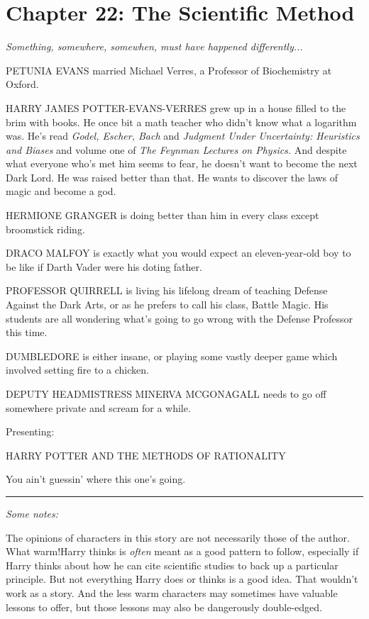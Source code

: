 \chapter{Chapter 22: The Scientific Method}
\emph{Something, somewhere, somewhen, must have happened
differently...}

PETUNIA EVANS married Michael Verres, a Professor of Biochemistry at
Oxford.

HARRY JAMES POTTER-EVANS-VERRES grew up in a house filled to the brim
with books. He once bit a math teacher who didn't know what a logarithm
was. He's read \emph{Godel, Escher, Bach} and \emph{Judgment Under
Uncertainty: Heuristics and Biases} and volume one of \emph{The Feynman
Lectures on Physics.} And despite what everyone who's met him seems to
fear, he doesn't want to become the next Dark Lord. He was raised better
than that. He wants to discover the laws of magic and become a god.

HERMIONE GRANGER is doing better than him in every class except
broomstick riding.

DRACO MALFOY is exactly what you would expect an eleven-year-old boy to
be like if Darth Vader were his doting father.

PROFESSOR QUIRRELL is living his lifelong dream of teaching Defense
Against the Dark Arts, or as he prefers to call his class, Battle Magic.
His students are all wondering what's going to go wrong with the Defense
Professor this time.

DUMBLEDORE is either insane, or playing some vastly deeper game which
involved setting fire to a chicken.

DEPUTY HEADMISTRESS MINERVA MCGONAGALL needs to go off somewhere private
and scream for a while.

Presenting:

HARRY POTTER AND THE METHODS OF RATIONALITY

You ain't guessin' where this one's going.

\begin{center}\rule{3in}{0.4pt}\end{center}

\emph{Some notes:}

The opinions of characters in this story are not necessarily those of
the author. What warm!Harry thinks is \emph{often} meant as a good
pattern to follow, especially if Harry thinks about how he can cite
scientific studies to back up a particular principle. But not everything
Harry does or thinks is a good idea. That wouldn't work as a story. And
the less warm characters may sometimes have valuable lessons to offer,
but those lessons may also be dangerously double-edged.

